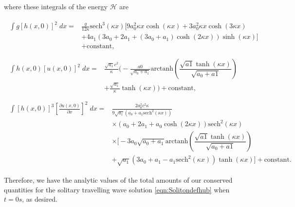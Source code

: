 where these integrals of the energy $\mathcal{H}$ are

\begin{align*}
\begin{split}
\int g\left[h(x,0)\right]^2 \; dx ={}& \frac{g}{12 \kappa }\text{sech}^3\left(\kappa x\right) \Bigg[9a_0^2 \kappa x \cosh\left(\kappa x\right) + 3 a_0^2 \kappa x \cosh\left(3\kappa x\right) \\ &+ 4 a_1 \left(3a_0 + 2 a_1 + \left(3a_0 + a_1\right)\cosh\left(2\kappa x\right)\right) \sinh\left(\kappa x\right)\Bigg] \\ &+ \text{constant},
\end{split}\\ \\
\begin{split}
\int h(x,0)\left[u(x,0)\right]^2 \; dx = {}& \frac{\sqrt{a_1}c^2}{\kappa} \Bigg( -\frac{a0}{\sqrt{a_0 + a_1}} \text{arctanh}\left(\dfrac{\sqrt{a1} \tanh\left(\kappa x\right)}{\sqrt{a_0 + a1}}\right)\\ &+ \frac{\sqrt{a_1}}{\kappa}\tanh\left(\kappa x\right)\Bigg)  + \text{constant},
\end{split} 
\\ \\
\begin{split}
\int \left[h(x,0)\right]^3 \left[\frac{\partial u(x,0)}{\partial x}\right]^2 \; dx = {}& \frac{2a_0^2c^2 \kappa }{9 \sqrt{a_1} \left(a_0 + a_1\text{sech}^2\left(\kappa x \right) \right)}   \\ &\times\left(a_0 + 2a_1 + a_0 \cosh\left(2\kappa x\right) \right) \text{sech}^2\left(\kappa x\right) \\&\times \Bigg[-3 a_0 \sqrt{a_0 + a_1}\text{arctanh}\left(\dfrac{\sqrt{a1} \tanh\left(\kappa x\right)}{\sqrt{a_0 + a1}}\right)  \\ &+ \sqrt{a_1}\left(3a_0 + a_1 - a_1\text{sech}^2\left(\kappa x\right)\right)\tanh(\kappa x) \Bigg]+ \text{constant}.
\end{split}
\end{align*}

Therefore, we have the analytic values of the total amounts of our conserved quantities for the solitary travelling wave solution \eqref{eqn:Solitondefhub} when $t=0s$, as desired.

